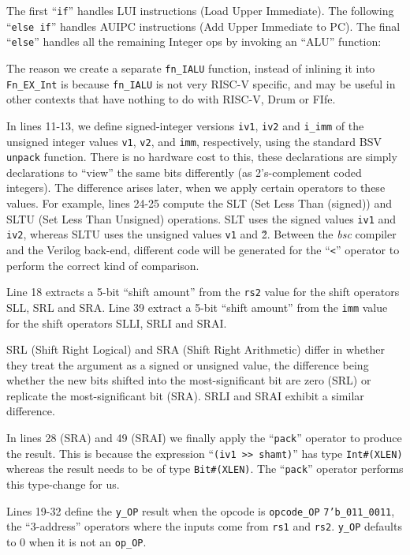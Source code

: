 The first ``\verb|if|'' handles LUI instructions (Load Upper
Immediate).  The following ``\verb|else if|'' handles AUIPC
instructions (Add Upper Immediate to PC). The final ``\verb|else|''
handles all the remaining Integer ops by invoking an ``ALU'' function:



The reason we create a separate \verb|fn_IALU| function, instead of
inlining it into \verb|Fn_EX_Int| is because \verb|fn_IALU| is not
very RISC-V specific, and may be useful in other contexts that have
nothing to do with RISC-V, Drum or FIfe.

In lines 11-13, we define signed-integer versions {\tt iv1}, {\tt iv2}
and \verb|i_imm| of the unsigned integer values {\tt v1}, {\tt v2},
and {\tt imm}, respectively, using the standard BSV \verb|unpack|
function.  There is no hardware cost to this, these declarations are
simply declarations to ``view'' the same bits differently (as
2's-complement coded integers).  The difference arises later, when we
apply certain operators to these values.  For example, lines 24-25
compute the SLT (Set Less Than (signed)) and SLTU (Set Less Than
Unsigned) operations.  SLT uses the signed values {\tt iv1} and {\tt
iv2}, whereas SLTU uses the unsigned values {\tt v1} and {\v2}.
Between the \emph{bsc} compiler and the Verilog back-end, different
code will be generated for the ``{\tt <}'' operator to perform the
correct kind of comparison.

Line 18 extracts a 5-bit ``shift amount'' from the {\tt rs2} value for
the shift operators SLL, SRL and SRA.  Line 39 extract a 5-bit ``shift
amount'' from the {\tt imm} value for the shift operators SLLI, SRLI
and SRAI.

SRL (Shift Right Logical) and SRA (Shift Right Arithmetic) differ in
whether they treat the argument as a signed or unsigned value, the
difference being whether the new bits shifted into the
most-significant bit are zero (SRL) or replicate the most-significant
bit (SRA).  SRLI and SRAI exhibit a similar difference.

In lines 28 (SRA) and 49 (SRAI) we finally apply the ``{\tt pack}''
operator to produce the result. This is because the expression
``\verb|(iv1 >> shamt)|'' has type {\tt Int\#(XLEN)} whereas the
result needs to be of type {\tt Bit\#(XLEN)}.  The ``{\tt pack}''
operator performs this type-change for us.

Lines 19-32 define the \verb|y_OP| result when the opcode is
\verb|opcode_OP| {\ie} {\tt 7'b\_011\_0011}, {\ie} the ``3-address''
operators where the inputs come from {\tt rs1} and {\tt rs2}.
\verb|y_OP| defaults to 0 when it is not an {\tt op\_OP}.

